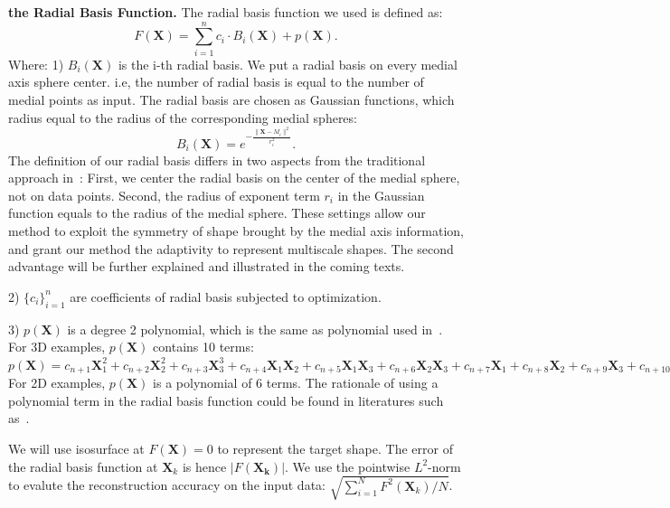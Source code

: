 \documentclass[review]{acmsiggraph}
\begin{document}
\textbf{the Radial Basis Function. }
The radial basis function we used is defined as:
\begin{equation}
F(\mathbf{X})=\sum_{i=1}^nc_i\cdot B_i(\mathbf{X})+p(\mathbf{X}).
\end{equation}
Where:
1)  $B_i(\mathbf{X})$ is the i-th radial basis. We put a radial basis on every medial axis sphere center. i.e, the number of radial basis is equal to the number of medial points as input. The radial basis are chosen as Gaussian functions, which radius equal to the radius of the corresponding medial spheres:
\begin{equation}
B_i(\mathbf{X})=e^{-\frac{\|\mathbf{X}-M_i\|^2}{r_i^2}}.
\end{equation}
The definition of our radial basis differs in two aspects from the traditional approach in~\cite{Carr-etal-2001}: First, we center the radial basis on the center of the medial sphere, not on data points. Second, the radius of exponent term $r_i$ in the Gaussian function equals to the radius of the medial sphere. These settings allow our method to exploit the symmetry of shape brought by the medial axis information, and grant our method the adaptivity to represent multiscale shapes. The second advantage will be further explained and illustrated in the coming texts.

2) $\{c_i\}_{i=1}^n $  are coefficients of radial basis subjected to optimization.

3) $p(\mathbf{X})$ is a degree 2 polynomial, which is the same as polynomial used in~\cite{Carr-etal-2001}. For 3D examples, $p(\mathbf{X})$ contains 10 terms: $p(\mathbf{X})=c_{n+1}\mathbf{X}_1^2+c_{n+2}\mathbf{X}_2^2+c_{n+3}\mathbf{X}_3^3+c_{n+4}\mathbf{X}_1\mathbf{X}_2+c_{n+5}\mathbf{X}_1\mathbf{X}_3+
c_{n+6}\mathbf{X}_2\mathbf{X}_3+c_{n+7}\mathbf{X}_1+c_{n+8}\mathbf{X}_2+c_{n+9}\mathbf{X}_3+c_{n+10}.$ For 2D examples, $p(\mathbf{X})$ is a polynomial of 6 terms. The rationale of using a polynomial term in the radial basis function could be found in literatures such as~\cite{Carr-etal-2001}.

We will use isosurface at $F(\mathbf{X})=0$ to represent the target shape. The error of the radial basis function at $\mathbf{X}_k$ is hence $|F(\mathbf{X_k})|$. We use the pointwise $L^2$-norm to evalute the reconstruction accuracy on the input data: $\sqrt{\sum_{i=1}^N F^2(\mathbf{X}_k)/N}$. 
\end{document}
